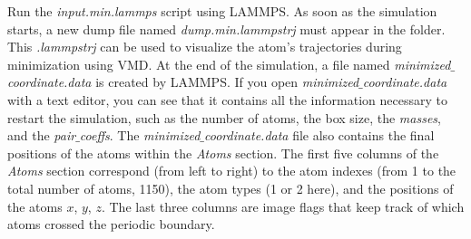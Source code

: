 \documentclass[9pt,tutorial]{livecoms}
\begin{document}
Run the \textit{input.min.lammps} script using LAMMPS. As soon as the simulation starts, a new dump file named \textit{dump.min.lammpstrj} must appear in the folder. This \textit{.lammpstrj} can be used to visualize the atom's trajectories during minimization using VMD. At the end of the simulation, a file named \textit{minimized$\_$coordinate.data} is created by LAMMPS. If you open \textit{minimized$\_$coordinate.data} with a text editor, you can see that it contains all the information necessary to restart the simulation, such as the number of atoms, the box size, the \textit{masses}, and the \textit{pair$\_$coeffs}.
The \textit{minimized$\_$coordinate.data} file also contains the final positions of the atoms within the \textit{Atoms} section. The first five columns of the \textit{Atoms} section correspond (from left to right) to the atom indexes (from 1 to the total number of atoms, 1150), the atom types (1 or 2 here), and the positions of the atoms $x$, $y$, $z$. The last three columns are image flags that keep track of which atoms crossed the periodic boundary.
\end{document}
